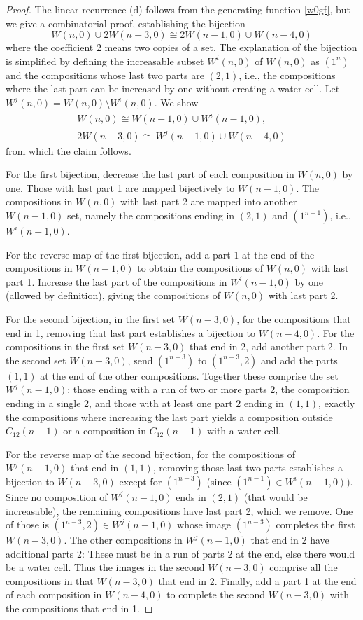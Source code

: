 \documentclass[]{interact}
\theoremstyle{plain}
\numberwithin{equation}{section} %
\numberwithin{table}{section} %
\numberwithin{figure}{section}
\begin{document}
\begin{proof}
The linear recurrence (d) follows from the generating function \eqref{w0gf}, but we give a combinatorial proof, establishing the bijection
\[W(n,0) \cup 2W(n-3,0) \cong 2W(n-1,0) \cup W(n-4,0)\]
where the coefficient 2 means two copies of a set.  The explanation of the bijection is simplified by defining the increasable subset $W^i(n,0)$ of $W(n,0)$ as $(1^n)$ and the compositions whose last two parts are $(2,1)$, i.e., the compositions where the last part can be increased by one without creating a water cell.  Let $W^j(n,0) = W(n,0) \setminus W^i(n,0)$.  We show 
\begin{gather*}
W(n,0) \cong W(n-1,0) \cup W^i(n-1,0), \\
2W(n-3,0) \cong\ W^j(n-1,0) \cup W(n-4,0)
\end{gather*}
from which the claim follows.

For the first bijection, decrease the last part of each composition in $W(n,0)$ by one.  Those with last part 1 are mapped bijectively to $W(n-1,0)$.  The compositions in $W(n,0)$ with last part 2 are mapped into another $W(n-1,0)$ set, namely the compositions ending in $(2,1)$ and $(1^{n-1})$, i.e., $W^i(n-1,0)$.

For the reverse map of the first bijection, add a part 1 at the end of the compositions in $W(n-1,0)$ to obtain the compositions of $W(n,0)$ with last part 1.  Increase the last part of the compositions in $W^i(n-1,0)$ by one (allowed by definition), giving the compositions of $W(n,0)$ with last part 2.

For the second bijection, in the first set $W(n-3,0)$, for the compositions that end in 1, removing that last part establishes a bijection to $W(n-4,0)$.  For the compositions in the first set $W(n-3,0)$ that end in 2, add another part 2.  In the second set $W(n-3,0)$, send $(1^{n-3})$ to $(1^{n-3},2)$ and add the parts $(1,1)$ at the end of the other compositions.  Together these comprise the set $W^j(n-1,0)$: those ending with a run of two or more parts 2, the composition ending in a single 2, and those with at least one part 2 ending in $(1,1)$, exactly the compositions where increasing the last part yields a composition outside $C_{12}(n-1)$ or a composition in $C_{12}(n-1)$ with a water cell.

For the reverse map of the second bijection, for the compositions of $W^j(n-1,0)$ that end in $(1,1)$, removing those last two parts establishes a bijection to $W(n-3,0)$ except for $(1^{n-3})$ (since $(1^{n-1}) \in W^i(n-1,0)$).  Since no composition of $W^j(n-1,0)$ ends in $(2,1)$ (that would be increasable), the remaining compositions have last part 2, which we remove.  One of those is $(1^{n-3},2) \in W^j(n-1,0)$ whose image $(1^{n-3})$ completes the first $W(n-3,0)$.  The other compositions in $W^j(n-1,0)$ that end in 2 have additional parts 2: These must be in a run of parts 2 at the end, else there would be a water cell.  Thus the images in the second $W(n-3,0)$ comprise all the compositions in that $W(n-3,0)$ that end in 2.  Finally, add a part 1 at the end of each composition in $W(n-4,0)$ to complete the second $W(n-3,0)$ with the compositions that end in 1.
\end{proof}
\end{document}
